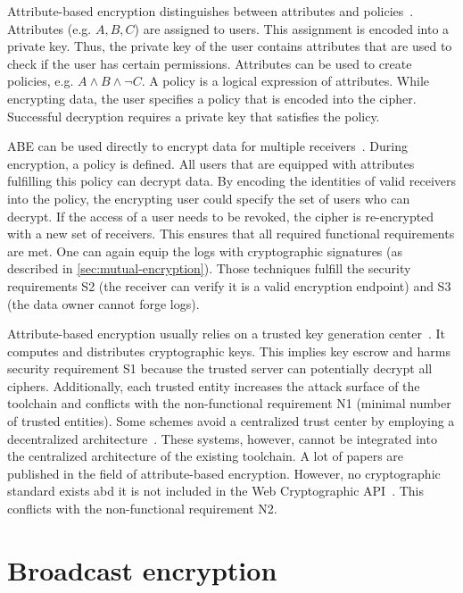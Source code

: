 \documentclass[../main.tex]{subfiles}
\begin{document}
Attribute-based encryption distinguishes between attributes and policies~\cite{Bethencourt2007}.
Attributes (e.g. ${A,B,C}$) are assigned to users.
This assignment is encoded into a private key.
Thus, the private key of the user contains attributes that are used to check if the user has certain permissions.
Attributes can be used to create policies, e.g. $A \land B \land \neg C$.
A policy is a logical expression of attributes.
While encrypting data, the user specifies a policy that is encoded into the cipher.
Successful decryption requires a private key that satisfies the policy.

ABE can be used directly to encrypt data for multiple receivers~\cite{Bethencourt2007}. 
During encryption, a policy is defined. 
All users that are equipped with attributes fulfilling this policy can decrypt data.
By encoding the identities of valid receivers into the policy, the encrypting user could specify the set of users who can decrypt.
If the access of a user needs to be revoked, the cipher is re-encrypted with a new set of receivers.
This ensures that all required functional requirements are met.
One can again equip the logs with cryptographic signatures (as described in \cref{sec:mutual-encryption}).
Those techniques fulfill the security requirements S2 (the receiver can verify it is a valid encryption endpoint) and S3 (the data owner cannot forge logs).

Attribute-based encryption usually relies on a trusted key generation center~\cite{Sahai2009}.
It computes and distributes cryptographic keys.
This implies key escrow and harms security requirement S1 because the trusted server can potentially decrypt all ciphers.
Additionally, each trusted entity increases the attack surface of the toolchain and conflicts with the non-functional requirement N1 (minimal number of trusted entities).
Some schemes avoid a centralized trust center by employing a decentralized architecture~\cite{Vaanchig2018}.
These systems, however, cannot be integrated into the centralized architecture of the existing toolchain.
A lot of papers are published in the field of attribute-based encryption.
However, no cryptographic standard exists abd it is not included in the Web Cryptographic API~\cite{WebCryptoApi2017}.
This conflicts with the non-functional requirement N2.

\section{Broadcast encryption}
\label{sec:broadcast-encryption}
\end{document}
